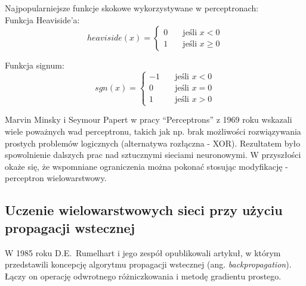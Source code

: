 \documentclass[a4paper,12pt]{article}
\numberwithin{figure}{section}
\begin{document}
    \noindent
    \begin{minipage}[H]{\textwidth}
        \setlength\parindent{17pt} Najpopularniejsze funkcje skokowe wykorzystywane w perceptronach: \\
        \bigskip
        \setlength\parindent{17pt} Funkcja Heaviside'a: \\
        \begin{equation}
            \label{eq:heaviside}
            heaviside(x) =
            \begin{cases}
                0 & \quad \text{jeśli } x < 0 \\
                1 & \quad \text{jeśli } x \geq 0
            \end{cases}
        \end{equation}
    \end{minipage}

    \smallskip

    \noindent
    \begin{minipage}[H]{\textwidth}
        \setlength\parindent{17pt} Funkcja signum: \\
        \begin{equation}
            \label{eq:signum}
            sgn(x) =
            \begin{cases}
                -1 & \quad \text{jeśli } x < 0 \\
                0 & \quad \text{jeśli } x = 0 \\
                1 & \quad \text{jeśli } x > 0
            \end{cases}
        \end{equation}
    \end{minipage}

    \bigskip

    Marvin Minsky i Seymour Papert w pracy ``Perceptrons'' z 1969 roku wskazali wiele poważnych wad perceptronu, takich jak np. brak możliwości rozwiązywania prostych problemów logicznych (alternatywa rozłączna - XOR). Rezultatem było spowolnienie dalszych prac nad sztucznymi sieciami neuronowymi. W przyszłości okaże się, że wspomniane ograniczenia można pokonać stosując modyfikację - perceptron wielowarstwowy\cite{UczenieMaszynowe2018}.

    \subsection{Uczenie wielowarstwowych sieci przy użyciu propagacji wstecznej}

    W 1985 roku D.E.\ Rumelhart i jego zespół opublikowali artykuł\cite{Backpropagation1985}, w którym przedstawili koncepcję algorytmu propagacji wstecznej (ang. \textit{backpropagation}).
    Łączy on operację odwrotnego różniczkowania i metodę gradientu prostego.
\end{document}
